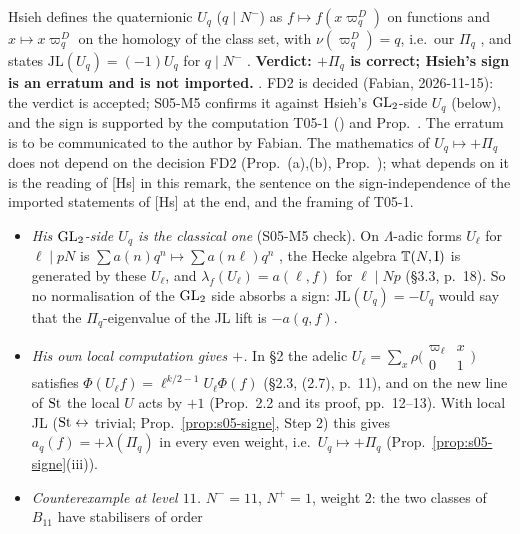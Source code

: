 \begin{remark}[Hsieh's $\mathrm{JL}(U_q)=-U_q$; FD2]\label{rem:s05-hsieh}
Hsieh defines the quaternionic $U_q$ ($q\mid N^-$) as $f\mapsto f(x\varpi^D_q)$ on functions and $x\mapsto x\varpi^D_q$ on the
homology of the class set, with $\nu(\varpi^D_q)=q$, i.e.\ our $\Pi_q$
, and states
$\mathrm{JL}(U_q)=(-1)U_q$ for $q\mid N^-$ . \textbf{Verdict: $+\Pi_q$ is correct; Hsieh's sign is an erratum and is not imported.} \stpmc.
FD2 is decided (Fabian, 2026-11-15): the verdict is accepted; S05-M5 confirms it against Hsieh's $\mathrm{GL}_2$-side $U_q$ (below), and the sign is supported by the computation T05-1 (\stcomp) and Prop.~. The erratum is to be communicated to the author by Fabian. The mathematics of $U_q\mapsto+\Pi_q$ does not depend on the decision FD2 (Prop.~(a),(b),
Prop.~); what depends on it is the reading of [Hs] in this remark, the sentence on the sign-independence of the imported statements
of [Hs] at the end, and the framing of T05-1.
\begin{itemize}
\item \emph{His $\mathrm{GL}_2$-side $U_q$ is the classical one} (S05-M5 check). On $\Lambda$-adic forms $U_\ell$ for $\ell\mid pN$ is
  $\sum a(n)q^n\mapsto\sum a(n\ell)q^n$ ,
  the Hecke algebra $\mathbb{T}(N,\mathrm I)$ is generated by these $U_\ell$, and $\lambda_f(U_\ell)=a(\ell,f)$ for $\ell\mid Np$
  (\S3.3, p.~18). So no normalisation of the $\mathrm{GL}_2$ side absorbs a sign: $\mathrm{JL}(U_q)=-U_q$ would say that the
  $\Pi_q$-eigenvalue of the JL lift is $-a(q,f)$.
\item \emph{His own local computation gives $+$.} In \S2 the adelic $U_\ell=\sum_x\rho\big(\begin{smallmatrix}\varpi_\ell&x\\0&1
  \end{smallmatrix}\big)$ satisfies $\Phi(U_\ell f)=\ell^{k/2-1}U_\ell\Phi(f)$ (\S2.3, (2.7), p.~11), and on the new line of $\mathrm{St}$ the
  local $U$ acts by $+1$ (Prop.~2.2 and its proof, pp.~12--13). With local JL ($\mathrm{St}\leftrightarrow$ trivial; Prop.~\ref{prop:s05-signe},
  Step 2) this gives $a_q(f)=+\lambda(\Pi_q)$ in every even weight, i.e.\ $U_q\mapsto+\Pi_q$
  (Prop.~\ref{prop:s05-signe}(iii)).
\item \emph{Counterexample at level $11$.} $N^-=11$, $N^+=1$, weight $2$: the two classes of $B_{11}$ have stabilisers of order

\end{itemize}
\end{remark}
